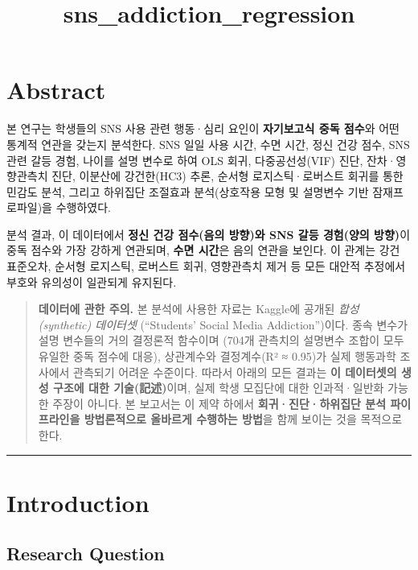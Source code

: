 \documentclass[11pt]{article}
\title{sns\_addiction\_regression}
\begin{document}
    
    \maketitle
    
    

    
    \hypertarget{abstract}{%
\section{Abstract}\label{abstract}}

본 연구는 학생들의 SNS 사용 관련 행동·심리 요인이 \textbf{자기보고식
중독 점수}와 어떤 통계적 연관을 갖는지 분석한다. SNS 일일 사용 시간,
수면 시간, 정신 건강 점수, SNS 관련 갈등 경험, 나이를 설명 변수로 하여
OLS 회귀, 다중공선성(VIF) 진단, 잔차·영향관측치 진단, 이분산에
강건한(HC3) 추론, 순서형 로지스틱·로버스트 회귀를 통한 민감도 분석,
그리고 하위집단 조절효과 분석(상호작용 모형 및 설명변수 기반
잠재프로파일)을 수행하였다.

분석 결과, 이 데이터에서 \textbf{정신 건강 점수(음의 방향)와 SNS 갈등
경험(양의 방향)}이 중독 점수와 가장 강하게 연관되며, \textbf{수면
시간}은 음의 연관을 보인다. 이 관계는 강건 표준오차, 순서형 로지스틱,
로버스트 회귀, 영향관측치 제거 등 모든 대안적 추정에서 부호와 유의성이
일관되게 유지된다.

\begin{quote}
\textbf{데이터에 관한 주의.} 본 분석에 사용한 자료는 Kaggle에 공개된
\emph{합성(synthetic) 데이터셋} (``Students' Social Media
Addiction'')이다. 종속 변수가 설명 변수들의 거의 결정론적 함수이며
(704개 관측치의 설명변수 조합이 모두 유일한 중독 점수에 대응),
상관계수와 결정계수(R² ≈ 0.95)가 실제 행동과학 조사에서 관측되기 어려운
수준이다. 따라서 아래의 모든 결과는 \textbf{이 데이터셋의 생성 구조에
대한 기술(記述)}이며, 실제 학생 모집단에 대한 인과적·일반화 가능한
주장이 아니다. 본 보고서는 이 제약 하에서 \textbf{회귀·진단·하위집단
분석 파이프라인을 방법론적으로 올바르게 수행하는 방법}을 함께 보이는
것을 목적으로 한다.
\end{quote}

    \begin{center}\rule{0.5\linewidth}{0.5pt}\end{center}

\hypertarget{introduction}{%
\section{Introduction}\label{introduction}}

\hypertarget{research-question}{%
\subsection{Research Question}\label{research-question}}
\end{document}

